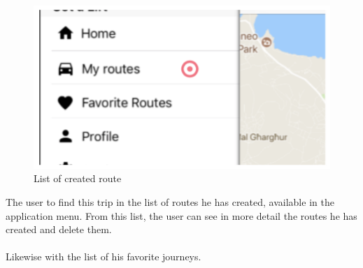 \begin{figure}[h!]
\begin{center}
\includegraphics[scale = 0.3]{diagrams/ListCreatedRoute.png} 
\end{center}
\caption{List of created route}
\end{figure}

The user to find this trip in the list of routes he has created, available in the application menu. From this list, the user can see in more detail the routes he has created and delete them.
\\\\
Likewise with the list of his favorite journeys.






















